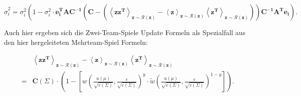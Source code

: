 \documentclass[12pt,a4paper]{scrartcl}
\numberwithin{equation}{section}
\begin{document}
 \begin{equation}
  \hat \sigma_i^2 = \sigma_i^2 (1- \sigma_i^2 \cdot \mathbf{e_i^T A C^{-1}(C- (\left < z z^T \right >_{z \sim \mathcal{R}(z)} - \left < z \right >_{z \sim \mathcal{R}(z)} \left < z^T \right >_{z \sim \mathcal{R}(z)}))} \mathbf{C^{-1} A^T e_i}).
 \end{equation}
 
 Auch hier ergeben sich die Zwei-Team-Spiele Update Formeln als Spezialfall aus den hier hergeleiteten Mehrteam-Spiel Formeln: 
 
 \begin{equation}
 \begin{split}
  & \mathbf{\left < z z^T \right >_{z \sim \mathcal{R}(z)} - \left < z \right >_{z \sim \mathcal{R}(z)} \left < z^T \right >_{z \sim \mathcal{R}(z)} }   \\ 
  = &\mathbf{C(\varSigma) \cdot } \left ( 1-  \left [ w \left( \frac{u(\mu)}{\sqrt{c(\varSigma)}}, \frac{\epsilon}{\sqrt{c(\varSigma)}} \right )^y \cdot \tilde w \left ( \frac{u(\mu)}{\sqrt{c(\varSigma)}}, \frac{\epsilon}{\sqrt{c(\varSigma)}} \right )^{1-y} \right ] \right ) .
 \end{split}
 \end{equation}


 
\end{document}
